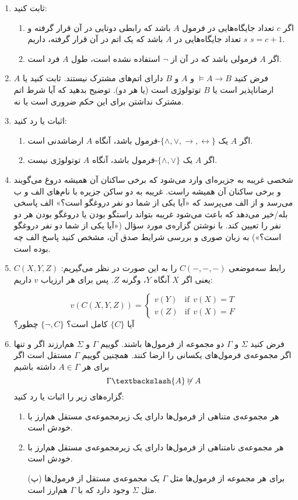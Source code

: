 \documentclass[12pt, 14paper]{article}
\begin{document}
\begin{enumerate}
\item
ثابت کنید:
\begin{enumerate}
\item
اگر $c$ تعداد جایگاه‌هایی در فرمول $A$ باشد که رابطی دوتایی در آن قرار گرفته و $s$ تعداد جایگاه‌هایی در $A$ باشد که یک اتم در آن قرار گرفته، داریم $s=c+1$.
\item
اگر $A$ فرمولی باشد که در آن از $\neg$ استفاده نشده است، طول $A$ فرد است.
\end{enumerate}

\item
فرض کنید $\models A\rightarrow B$ و $A$ و $B$ دارای اتم‌های مشترک نیستند. ثابت کنید یا $A$ ارضاناپذیر است یا $B$ توتولوژی است (یا هر دو). توضیح بدهید که آیا شرط اتم مشترک نداشتن برای این حکم ضروری است یا نه.

\pagebreak

\item
اثبات یا رد کنید:

\begin{enumerate}
\item
اگر $A$ یک $\{\wedge,\vee,\rightarrow,\leftrightarrow\}$-فرمول باشد، آنگاه $A$ ارضاشدنی است.
\item
اگر $A$ یک $\{\wedge,\vee\}$-فرمول باشد، آنگاه $A$ توتولوژی نیست.
\end{enumerate}

\item
شخصی غریبه به جزیره‌ای وارد می‌شود که برخی ساکنان آن همیشه دروغ می‌گویند و برخی ساکنان آن همیشه راست. غریبه به دو ساکن جزیره با نام‌های الف و ب می‌رسد و از الف می‌پرسد که «آیا یکی از شما دو نفر دروغگو است؟» الف پاسخی بله/خیر می‌دهد که باعث می‌شود غریبه بتواند راستگو بودن یا دروغگو بودن هر دو نفر را تعیین کند. با نوشتن گزاره‌ی مورد سؤال («آیا یکی از شما دو نفر دروغگو است؟») به زبان صوری و بررسی شرایط صدق آن، مشخص کنید پاسخ الف چه بوده است.

\item
رابط سه‌موضعی $C(-,-,-)$ را به این صورت در نظر می‌گیریم: $C(X,Y,Z)$ یعنی اگر $X$ آنگاه $Y$، وگرنه $Z$. پس برای هر ارزیاب $v$ داریم:

$$
v(C(X,Y,Z))=
\begin{cases}
v(Y) & \text{if}~~v(X)=T\\
v(Z) & \text{if}~~v(X)=F
\end{cases}
$$
آیا $\{C\}$ کامل است؟ $\{\neg, C\}$ چطور؟

\item
فرض کنید $\Sigma$ و $\Gamma$ دو مجموعه از فرمول‌ها باشند. گوییم $\Gamma$ و $\Sigma$ هم‌ارزند اگر و تنها اگر مجموعه‌ی فرمول‌های یکسانی را ارضا کنند. همچنین گوییم $\Gamma$ مستقل است اگر برای هر $A\in\Gamma$ داشته باشیم
$$
\Gamma\textbackslash\{A\}\not\vDash A
$$
گزاره‌های زیر را اثبات یا رد کنید:
\begin{enumerate}
\item
هر مجموعه‌ی متناهی از فرمول‌ها دارای یک زیرمجموعه‌ی مستقل هم‌ارز با خودش است.
\item
هر مجموعه‌ی نامتناهی از فرمول‌ها دارای یک زیرمجموعه‌ی مستقل هم‌ارز با خودش است.
\item[(پ)]
برای هر مجموعه از فرمول‌ها مثل $\Gamma$ یک مجموعه‌ی مستقل از فرمول‌ها مثل $\Sigma$ وجود دارد که با $\Gamma$ هم‌ارز است.
\end{enumerate}


\end{enumerate}
\end{document}
